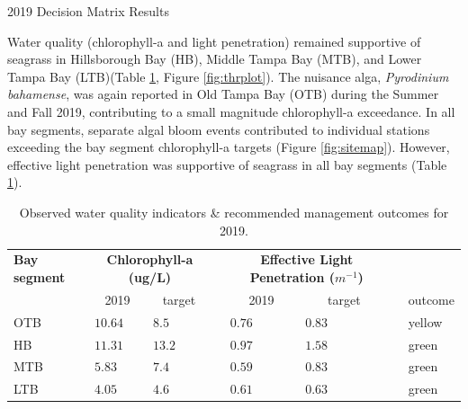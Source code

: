 \documentclass[final,t]{beamer}\usepackage[]{graphicx}\usepackage[]{color}
\begin{document}
\begin{frame}
\begin{columns}[t]
\begin{column}{.63\linewidth}
\begin{block}{2019 Decision Matrix Results}
\begin{minipage}{0.4\textwidth}
\scriptsize
Water quality (chlorophyll-a and light penetration) remained supportive of seagrass in Hillsborough Bay (HB), Middle Tampa Bay (MTB), and Lower Tampa Bay (LTB)(Table \ref{tab:segtab}, Figure \ref{fig:thrplot}). The nuisance alga, \textit{Pyrodinium bahamense}, was again reported in Old Tampa Bay (OTB) during the Summer and Fall 2019, contributing to a small magnitude chlorophyll-a exceedance. In all bay segments, separate algal bloom events contributed to individual stations exceeding the bay segment chlorophyll-a targets (Figure \ref{fig:sitemap}). However, effective light penetration was supportive of seagrass in all bay segments (Table \ref{tab:segtab}).
\end{minipage}
\hspace{0.01in}
\begin{minipage}{0.55\textwidth}
\tiny
\begin{table}[!tbp]
\caption{{\scriptsize Observed water quality indicators \& recommended management outcomes for 2019.}\label{tab:segtab}} 
\begin{center}
\begin{tabular}{lp{0.15in}p{0.15in}cp{0.15in}p{0.15in}cp{0.15in}}
\hline\hline
\multicolumn{1}{l}{\bfseries \parbox{0.5cm}{Bay segment}}&\multicolumn{2}{c}{\bfseries \parbox{1cm}{Chlorophyll-a (ug/L)}}&\multicolumn{1}{c}{\bfseries }&\multicolumn{2}{c}{\bfseries \parbox{1.5cm}{Effective Light Penetration ($m^{-1}$)}}&\multicolumn{1}{c}{\bfseries }&\multicolumn{1}{c}{\bfseries }\tabularnewline
\cline{2-3} \cline{5-6}
\multicolumn{1}{l}{}&\multicolumn{1}{c}{2019}&\multicolumn{1}{c}{target}&\multicolumn{1}{c}{}&\multicolumn{1}{c}{2019}&\multicolumn{1}{c}{target}&\multicolumn{1}{c}{}&\multicolumn{1}{c}{\parbox{0.5cm}{outcome}}\tabularnewline
\hline
OTB&$10.64$&$ 8.5$&&$0.76$&$0.83$&&\cellcolor{yellow}yellow\tabularnewline
HB&$11.31$&$13.2$&&$0.97$&$1.58$&&\cellcolor{green}green\tabularnewline
MTB&$ 5.83$&$ 7.4$&&$0.59$&$0.83$&&\cellcolor{green}green\tabularnewline
LTB&$ 4.05$&$ 4.6$&&$0.61$&$0.63$&&\cellcolor{green}green\tabularnewline
\hline
\end{tabular}\end{center}
\end{table}


\end{minipage}
\end{block}
\end{column}
\end{columns}
\end{frame}
\end{document}
